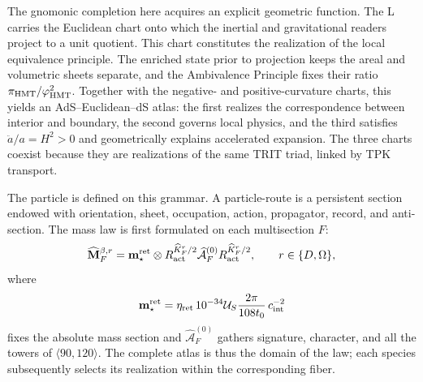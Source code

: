 The gnomonic completion here acquires an explicit geometric function. The L carries the Euclidean chart onto which the inertial and gravitational readers project to a unit quotient. This chart constitutes the realization of the local equivalence principle. The enriched state prior to projection keeps the areal and volumetric sheets separate, and the Ambivalence Principle fixes their ratio \(\pi_{\rm HMT}/\varphi_{\rm HMT}^{2}\). Together with the negative- and positive-curvature charts, this yields an AdS--Euclidean--dS atlas: the first realizes the correspondence between interior and boundary, the second governs local physics, and the third satisfies \(\ddot a/a=H^2>0\) and geometrically explains accelerated expansion. The three charts coexist because they are realizations of the same TRIT triad, linked by TPK transport.

The particle is defined on this grammar. A particle-route is a persistent
section endowed with orientation, sheet, occupation, action, propagator,
record, and anti-section. The mass law is first formulated on each
multisection \(F\):
\[
 \widehat{\mathbf M}^{\beta,r}_F
 =\mathbf m_\star^{\rm ret}\otimes
  R_{\rm act}^{\widehat K_F^r/2}
  \widehat{\mathcal A}^{(0)}_F
  R_{\rm act}^{\widehat K_F^r/2},
 \qquad r\in\{D,\Omega\},
\]
where
\[
 \mathbf m_\star^{\rm ret}
 =\eta_{\rm ret}\,10^{-34}\mathcal U_S
   \frac{2\pi}{108t_0}\,c_{\rm int}^{-2}
\]
fixes the absolute mass section and
\(\widehat{\mathcal A}^{(0)}_F\) gathers signature, character, and all the towers of
\(\langle90,120\rangle\). The complete atlas is thus the domain of the law; each
species subsequently selects its realization within the corresponding fiber.

